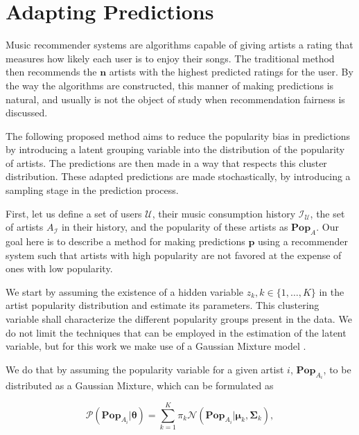 \documentclass{article}
\begin{document}
\section{Adapting Predictions}\label{sec:methods}


Music recommender systems are algorithms capable of giving
artists a rating that measures how likely each user is to 
enjoy their songs. The traditional method then recommends the
$\mathbf{n}$ artists with the highest predicted ratings for the user.
By the way the algorithms are constructed, this manner
of making predictions is natural, and usually is not the
object of study when recommendation fairness is discussed. 

The following proposed method aims to reduce the popularity
bias in predictions by introducing a latent grouping variable into the distribution of the popularity of artists. The predictions are then made in a way that
respects this cluster distribution.
These adapted predictions
are made stochastically, by introducing
a sampling stage in the prediction process. 

First, let us define a set of users $\mathcal{U}$, 
their music consumption history $\mathcal{I}_{\mathcal{U}}$,
the set of artists $A_{\mathcal{I}}$ in their history, and
the popularity of these artists as $\boldsymbol{Pop}_{A}$. 
Our goal here is to describe a method for making
predictions $\boldsymbol{p}$ using a recommender system
such that artists with high popularity are not favored
at the expense of ones with low popularity. 

We start by assuming the existence of a
hidden variable $z_k, k  \in \{1,\dots,K\}$ 
in the artist popularity distribution and estimate
its parameters. This clustering variable shall 
characterize the different popularity groups present in 
the data. We do not limit the techniques that 
can be employed in the estimation of the latent
variable, but for this work we make
use of a Gaussian Mixture model
\cite{murphy2012machine}. 

We do that by assuming the popularity variable for a given
artist $i$, 
$\boldsymbol{Pop}_{A}_{i}$, to be distributed as a 
Gaussian Mixture, which can be formulated as

$$ \mathcal{P}(\boldsymbol{Pop}_{A}_{i} |\boldsymbol{\theta}) = 
\sum_{k = 1}^{K} \pi_k \mathcal{N}(\boldsymbol{Pop}_{A}_{i}   | \boldsymbol{\mu}_k, \boldsymbol{\Sigma}_k),$$
\end{document}
